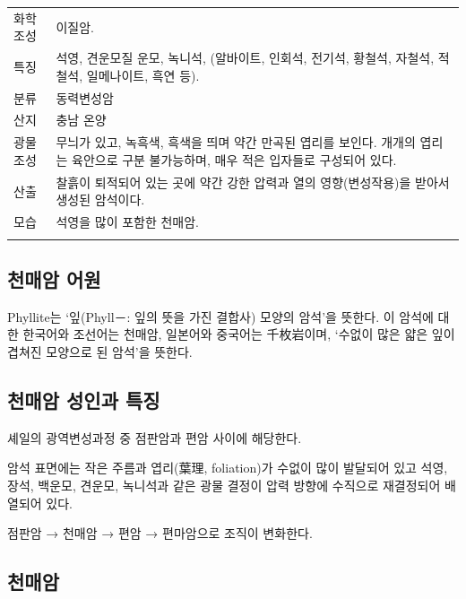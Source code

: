 \documentclass[12pt, a4paper, twoside]{book}
\begin{document}
				\begin{tabu} to 1.0\textwidth { X[l, 1.0] X[l, 3.0] }
				\tabucline[0.2ex]{-}		
				화학조성	&
				이질암.	\\
				특징	&
				석영, 견운모질 운모, 녹니석, (알바이트, 인회석, 전기석, 황철석, 자철석, 적철석, 일메나이트, 흑연 등).	\\
				분류	&
				동력변성암	\\
				산지	&
				충남 온양	\\
				광물조성	&
				무늬가 있고, 녹흑색, 흑색을 띄며 약간 만곡된 엽리를 보인다. 개개의 엽리는 육안으로 구분 불가능하며, 매우 적은 입자들로 구성되어 있다.	\\
				산출	&
				찰흙이 퇴적되어 있는 곳에 약간 강한 압력과 열의 영향(변성작용)을 받아서 생성된 암석이다. 	\\
				모습	&
				석영을 많이 포함한 천매암.	\\
				\tabucline[0.1ex]{-}		
				\end{tabu} 






		\subsection{천매암 어원}

				Phyllite는 ‘잎(Phyll－: 잎의 뜻을 가진 결합사) 모양의 암석’을 뜻한다. 
				이 암석에 대한 한국어와 조선어는 천매암, 일본어와 중국어는 千枚岩이며, ‘수없이 많은 얇은 잎이 겹쳐진 모양으로 된 암석’을 뜻한다.



		\subsection{천매암 성인과 특징}

				셰일의 광역변성과정 중 점판암과 편암 사이에 해당한다. 

				암석 표면에는 작은 주름과 엽리(葉理, foliation)가 수없이 많이 발달되어 있고 석영, 장석, 백운모, 견운모, 녹니석과 같은 광물 결정이 압력 방향에 수직으로 재결정되어 배열되어 있다.

				점판암 → 천매암 → 편암 → 편마암으로 조직이 변화한다. 


		\subsection{천매암}
\end{document}
